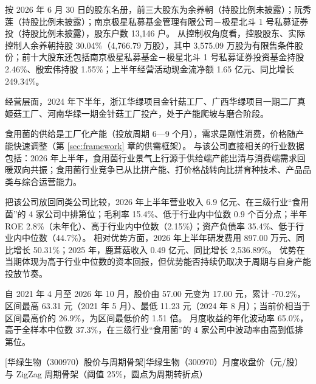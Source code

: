  按 2026 年 6 月 30 日的股东名册，前三大股东为余养朝（持股比例未披露）；阮秀莲（持股比例未披露）；南京极星私募基金管理有限公司－极星北斗 1 号私募证券投（持股比例未披露），股东户数 13,146 户。 从控制权角度看，控股股东、实际控制人余养朝持股 30.04\%（4,766.79 万股），其中 3,575.09 万股为有限售条件股份；前十大股东还包括南京极星私募基金－极星北斗 1 号私募证券投资基金持股 2.46\%、殷宏伟持股 1.55\%；上半年经营活动现金流净额 1.65 亿元、同比增长 249.34\%。

 经营层面，2024 年下半年，浙江华绿项目金针菇工厂、广西华绿项目一期二厂真姬菇工厂、河南华绿一期金针菇工厂投产，处于产能爬坡与磨合阶段。

 食用菌的供给是工厂化产能（投放周期 6---9 个月），需求是刚性消费，价格随产能快速调整（第 \ref{sec:framework} 章的供需框架）。 与该公司直接相关的行业数据包括：2026 年上半年，食用菌行业景气上行源于供给端产能出清与消费端需求回暖双向共振；食用菌行业竞争已从比拼产能、打价格战转向比拼育种技术、产品品类与综合运营能力。

 把该公司放回同类公司比较，2026 年上半年营业收入 6.9 亿元、在三级行业“食用菌”的 4 家公司中排第位；毛利率 15.4\%、低于行业内中位数 0.9 个百分点；半年 ROE 2.8\%（未年化）、高于行业内中位数（2.15\%）；资产负债率 35.4\%、低于行业内中位数（44.7\%）。 相对优势方面，2026 年上半年研发费用 897.00 万元、同比增长 50.31\%；2025 年，鹿茸菇收入 0.49 亿元、同比增长 2,536.89\%。 优势在当期体现为高于行业中位数的资本回报，但优势能否持续仍取决于周期与自身产能投放节奏。

 自 2021 年 4 月至 2026 年 10 月，股价由 57.00 元变为 17.00 元，累计 -70.2\%，区间最高 63.31 元（2021 年 5 月）、最低 11.23 元（2024 年 8 月）；当前价相当于区间最高价的 26.9\%，为区间最低价的 1.51 倍。 月度收益的年化波动率 65.0\%，高于全样本中位数 37.3\%，在三级行业“食用菌”的 4 家公司中波动率由高到低排第位。

\begin{center}
\begin{minipage}{\textwidth}\centering
{}

[华绿生物（300970）股价与周期骨架]{华绿生物（300970）月度收盘价（元/股）与 ZigZag 周期骨架（阈值 25\%，圆点为周期转折点）}
\end{minipage}
\end{center}


